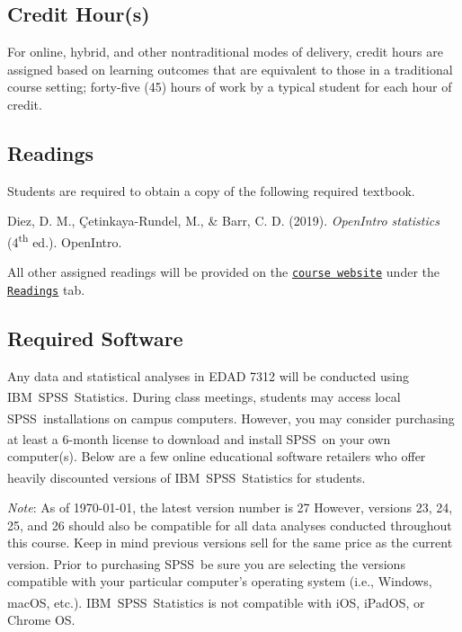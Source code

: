 \documentclass[
]{article}
\begin{document}
\subsection{Credit Hour(s)}

For online, hybrid, and other nontraditional modes of delivery, credit
hours are assigned based on learning outcomes that are equivalent to
those in a traditional course setting; forty-five (45) hours of work by
a typical student for each hour of credit.

\subsection{Readings}

Students are required to obtain a copy of the following required
textbook.

\begin{hangparas}{.4in}{1}
Diez, D. M.,  \c{C}etinkaya-Rundel, M., \& Barr, C. D. (2019).  {\em{OpenIntro statistics}} (4\textsuperscript{th} ed.).  OpenIntro.
\end{hangparas}

All other assigned readings will be provided on the
\texttt{\href{https://mycourses.umhb.edu/courses/23599}{course website}}
under the
\texttt{\href{https://mycourses.umhb.edu/courses/23599/files/folder/Readings}{Readings}}
tab.

\subsection{Required Software}

Any data and statistical analyses in EDAD 7312 will be conducted using
IBM\textsuperscript{\textregistered}~SPSS\textsuperscript{\textregistered}~Statistics.
During class meetings, students may access local
SPSS\textsuperscript{\textregistered}~installations on campus computers.
However, you may consider purchasing at least a 6-month license to
download and install SPSS\textsuperscript{\textregistered}~on your own
computer(s). Below are a few online educational software retailers who
offer heavily discounted versions of
IBM\textsuperscript{\textregistered}~SPSS\textsuperscript{\textregistered}~Statistics
for students.

\emph{Note}: As of \today, the latest version number is 27 However,
versions 23, 24, 25, and 26 should also be compatible for all data
analyses conducted throughout this course. Keep in mind previous
versions sell for the same price as the current version. Prior to
purchasing SPSS\textsuperscript{\textregistered}~be sure you are
selecting the versions compatible with your particular computer's
operating system (i.e., Windows, macOS, etc.).
IBM\textsuperscript{\textregistered}~SPSS\textsuperscript{\textregistered}~Statistics
is not compatible with iOS, iPadOS, or Chrome OS.
\end{document}
